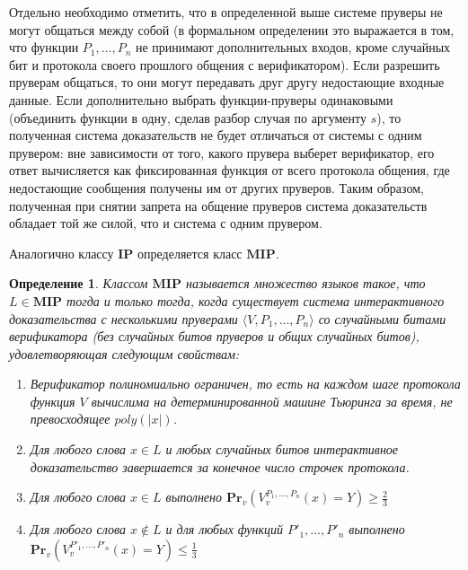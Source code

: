 \documentclass[14pt, a4paper]{extreport}
\newtheorem{definition}{\indent Определение}
\newcommand{\poly}{\textit{poly}}
\newcommand{\pr}[2]{\textbf{Pr}_{#1}\left(#2\right)}
\begin{document}
Отдельно необходимо отметить, что в определенной выше системе пруверы не могут общаться между собой (в формальном определении это выражается в том, что функции $P_1, \dots, P_n$ не принимают дополнительных входов, кроме случайных бит и протокола своего прошлого общения с верификатором). Если разрешить пруверам общаться, то они могут передавать друг другу недостающие входные данные. Если дополнительно выбрать функции-пруверы одинаковыми (объединить функции в одну, сделав разбор случая по аргументу $s$), то полученная система доказательств не будет отличаться от системы с одним прувером: вне зависимости от того, какого прувера выберет верификатор, его ответ вычисляется как фиксированная функция от всего протокола общения, где недостающие сообщения получены им от других пруверов. Таким образом, полученная при снятии запрета на общение пруверов система доказательств обладает той же силой, что и система с одним прувером.

Аналогично классу $\textbf{IP}$ определяется класс $\textbf{MIP}$.

\begin{definition}\label{mip}
    Классом $\textbf{MIP}$ называется множество языков такое, что $L \in \textbf{MIP}$ тогда и только тогда, когда существует система интерактивного доказательства с несколькими пруверами $\langle V, P_1, \ldots, P_n\rangle$ со случайными битами верификатора (без случайных битов пруверов и общих случайных битов), удовлетворяющая следующим свойствам:
    \begin{enumerate}
        \item Верификатор полиномиально ограничен, то есть на каждом шаге протокола функция $V$ вычислима на детерминированной машине Тьюринга за время, не превосходящее $\poly(|x|)$.
        \item Для любого слова $x \in L$ и любых случайных битов интерактивное доказательство завершается за конечное число строчек протокола.
        \item Для любого слова $x \in L$ выполнено $\pr{v}{V^{P_1, \ldots, P_n}_{v}(x) = Y} \geqslant\frac{2}{3}$
        \item Для любого слова $x \notin L$ и для любых функций $P'_1, \ldots, P'_n$ выполнено\\$\pr{v}{V^{P'_1, \ldots, P'_n}_{v}(x) = Y} \leqslant \frac{1}{3}$
    \end{enumerate}
\end{definition}
\end{document}
